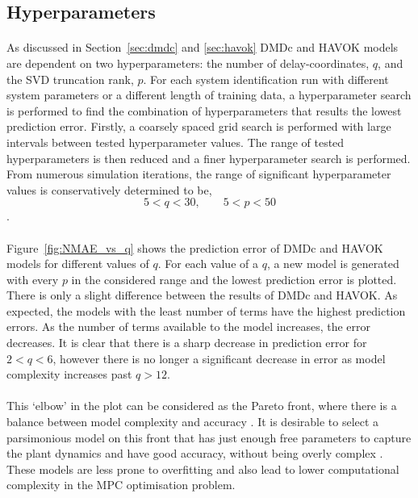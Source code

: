     \subsection{Hyperparameters} \label{sec:hyperparameters}
        
        \paragraph{}
        As discussed in Section~\ref{sec:dmdc} and \ref{sec:havok} 
        DMDc and HAVOK models are dependent on two hyperparameters: 
        the number of delay-coordinates, $q$, 
        and the SVD truncation rank, $p$.
        For each system identification run with different system parameters or a different length of training data,
        a hyperparameter search is performed to find the combination of hyperparameters 
        that results the lowest prediction error.
        Firstly, a coarsely spaced grid search is performed with large intervals between tested hyperparameter values.
        The range of tested hyperparameters is then reduced and a finer hyperparameter search is performed.
        From numerous simulation iterations, the range of significant hyperparameter values is conservatively determined to be,
        \begin{equation}
            5 < q < 30, \phantom{--} 5 < p < 50
        \end{equation}.

         

        \paragraph{}
        Figure~\ref{fig:NMAE_vs_q} shows the prediction error of DMDc and HAVOK models for different values of $q$.
        For each value of a $q$, a new model is generated with every $p$ in the considered range 
        and the lowest prediction error is plotted.
        There is only a slight difference between the results of DMDc and HAVOK.
        As expected, the models with the least number of terms have the highest prediction errors.
        As the number of terms available to the model increases, the error decreases.
        It is clear that there is a sharp decrease in prediction error for $2 < q < 6$, 
        however there is no longer a significant decrease in error
        as model complexity increases past $q > 12$.        

        \paragraph{}
        This `elbow' in the plot can be considered as the Pareto front, 
        where there is a balance between model complexity and accuracy \cite{Mangan2017}.
        It is desirable to select a parsimonious model on this front that has just enough free parameters 
        to capture the plant dynamics and have good accuracy, 
        without being overly complex \cite{Brunton2019b}.
        These models are less prone to overfitting 
        and also lead to lower computational complexity in the MPC optimisation problem.        

